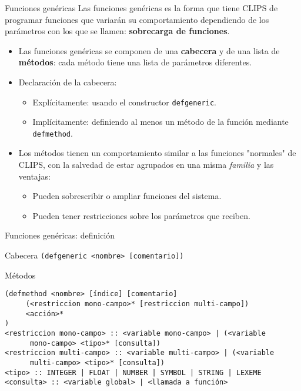\documentclass[usenames,dvipsnames,aspectratio=169]{beamer}
\begin{document}
\begin{frame}{Funciones genéricas}
	Las funciones genéricas es la forma que tiene CLIPS de programar funciones que variarán su comportamiento dependiendo de los parámetros con los que se llamen: \textbf{sobrecarga de funciones}.
	\begin{itemize}
		\item Las funciones genéricas se componen de una \textbf{cabecera} y de una lista de \textbf{métodos}: cada método tiene una lista de parámetros diferentes.
		\item Declaración de la cabecera:
		\begin{itemize}
			\item Explícitamente: usando el constructor \texttt{defgeneric}.
			\item Implícitamente: definiendo al menos un método de la función mediante \texttt{defmethod}.
		\end{itemize}
		\item Los métodos tienen un comportamiento similar a las funciones "normales" de CLIPS, con la salvedad de estar agrupados en una misma \textit{familia} y las ventajas:
		\begin{itemize}
			\item Pueden sobrescribir o ampliar funciones del sistema.
			\item Pueden tener restricciones sobre los parámetros que reciben.
		\end{itemize}
	\end{itemize}
\end{frame}

\begin{frame}[fragile]{Funciones genéricas: definición}
	\footnotesize
	\begin{block}{Cabecera}
		\texttt{(defgeneric <nombre> [comentario])}
	\end{block}
	\begin{block}{Métodos}
		\begin{verbatim}
(defmethod <nombre> [índice] [comentario]
     (<restriccion mono-campo>* [restriccion multi-campo])
     <acción>*
)
<restriccion mono-campo> :: <variable mono-campo> | (<variable
      mono-campo> <tipo>* [consulta])
<restriccion multi-campo> :: <variable multi-campo> | (<variable
      multi-campo> <tipo>* [consulta])
<tipo> :: INTEGER | FLOAT | NUMBER | SYMBOL | STRING | LEXEME
<consulta> :: <variable global> | <llamada a función>
		\end{verbatim}
	\end{block}
\end{frame}
\end{document}
